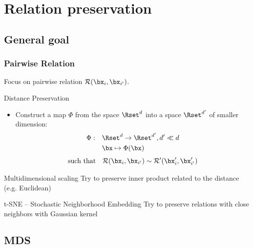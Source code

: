 \documentclass{beamer}\usepackage[]{graphicx}\usepackage[]{color}
\begin{document}
\section{Relation preservation}

\subsection{General goal}

\begin{frame}
    \frametitle{Pairwise Relation}

    Focus on pairwise relation $\mathcal{R}(\bx_i, \bx_{i'})$.

    \begin{block}{Distance Preservation}
      \begin{itemize}
    \item  Construct a map $\Phi$ from the space $\Rset^{d}$ into a space $\Rset^{d'}$ of \alert{smaller dimension}:
      \begin{align*}
      \Phi:\quad & \Rset^d \to \Rset^{d'}, d' \ll d\\
               & \bx \mapsto \Phi(\bx)
      \end{align*}
      \begin{equation*}
      \text{such that} \quad \mathcal{R}(\bx_i, \bx_{i'}) \sim\mathcal{R'}(\bx'_i, \bx'_{i'})
      \end{equation*}
    \end{itemize}
  \end{block}

  \begin{block}{Multidimensional scaling}
    Try to preserve inner product related to the distance (e.g. Euclidean)
  \end{block}

  \vfill

  \begin{block}{t-SNE -- Stochastic Neighborhood Embedding}
    Try to preserve relations with close neighbors with Gaussian kernel
  \end{block}

\end{frame}


\subsection{MDS}
\end{document}
